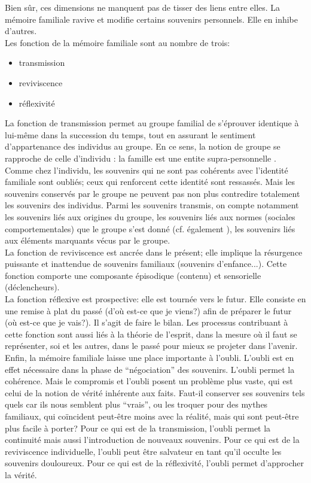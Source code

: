 \documentclass[french]{article}
\begin{document}
			Bien sûr, ces dimensions ne manquent pas de tisser des liens entre elles. La mémoire familiale ravive et modifie certains souvenirs personnels. Elle en inhibe d'autres.\\
			Les fonction de la mémoire familiale sont au nombre de trois:
			\begin{itemize}
				\item transmission
				\item reviviscence
				\item réflexivité
			\end{itemize}
			La fonction de transmission permet au groupe familial de s'éprouver identique à lui-même dans la succession du temps, tout en assurant le sentiment d'appartenance des individus au groupe. En ce sens, la notion de groupe se rapproche de celle d'individu : la famille est une entite supra-personnelle \cite{boesen2012}. Comme chez l'individu, les souvenirs qui ne sont pas cohérents avec l'identité familiale sont oubliés; ceux qui renforcent cette identité sont ressassés. Mais les souvenirs conservés par le groupe ne peuvent pas non plus contredire totalement les souvenirs des individus. Parmi les souvenirs transmis, on compte notamment les souvenirs liés aux origines du groupe, les souvenirs liés aux normes (sociales comportementales) que le groupe s'est donné (cf. également \cite[p.~110-111]{halbwachs1925}), les souvenirs liés aux éléments marquants vécus par le groupe.\\
			La fonction de reviviscence est ancrée dans le présent; elle implique la résurgence puissante et inattendue de souvenirs familiaux (souvenirs d'enfance...). Cette fonction comporte une composante épisodique (contenu) et sensorielle (déclencheurs).\\
			La fonction réflexive est prospective: elle est tournée vers le futur. Elle consiste en une remise à plat du passé (d'où est-ce que je viens?) afin de préparer le futur (où est-ce que je vais?). Il s'agit de faire le bilan. Les processus contribuant à cette fonction sont aussi liés à la théorie de l'esprit, dans la mesure où il faut se représenter, soi et les autres, dans le passé pour mieux se projeter dans l'avenir. \\
			
			Enfin, la mémoire familiale laisse une place importante à l'oubli. L'oubli est en effet nécessaire dans la phase de ``négociation'' des souvenirs. L'oubli permet la cohérence. Mais le compromis et l'oubli posent un problème plus vaste, qui est celui de la notion de vérité inhérente aux faits. Faut-il conserver ses souvenirs tels quels car ils nous semblent plus ``vrais'', ou les troquer pour des mythes familiaux, qui coïncident peut-être moins avec la réalité, mais qui sont peut-être plus facile à porter? Pour ce qui est de la transmission, l'oubli permet la continuité mais aussi l'introduction de nouveaux souvenirs. Pour ce qui est de la reviviscence individuelle, l'oubli peut être salvateur en tant qu'il occulte les souvenirs douloureux. Pour ce qui est de la réflexivité, l'oubli permet d'approcher la vérité.
\end{document}
